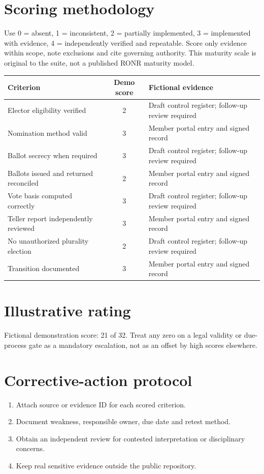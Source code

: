 \documentclass[11pt]{article}
\begin{document}
\SuiteOpen
\section{Scoring methodology}
Use 0 = absent, 1 = inconsistent, 2 = partially implemented, 3 = implemented with evidence, 4 = independently verified and repeatable. Score only evidence within scope, note exclusions and cite governing authority. This maturity scale is original to the suite, not a published RONR maturity model.

\small\begin{longtable}{@{}p{.44\linewidth}cp{.39\linewidth}@{}}\toprule Criterion & Demo score & Fictional evidence\\\midrule\endhead

Elector eligibility verified & 2 & Draft control register; follow-up review required\\
Nomination method valid & 3 & Member portal entry and signed record\\
Ballot secrecy when required & 3 & Draft control register; follow-up review required\\
Ballots issued and returned reconciled & 2 & Member portal entry and signed record\\
Vote basis computed correctly & 3 & Draft control register; follow-up review required\\
Teller report independently reviewed & 3 & Member portal entry and signed record\\
No unauthorized plurality election & 2 & Draft control register; follow-up review required\\
Transition documented & 3 & Member portal entry and signed record\\
\bottomrule\end{longtable}\normalsize
\section{Illustrative rating}
Fictional demonstration score: 21 of 32. Treat any zero on a legal validity or due-process gate as a mandatory escalation, not as an offset by high scores elsewhere.

\section{Corrective-action protocol}
\begin{enumerate}[leftmargin=*,itemsep=4pt]
\item Attach source or evidence ID for each scored criterion.
\item Document weakness, responsible owner, due date and retest method.
\item Obtain an independent review for contested interpretation or disciplinary concerns.
\item Keep real sensitive evidence outside the public repository.
\end{enumerate}
\end{document}
